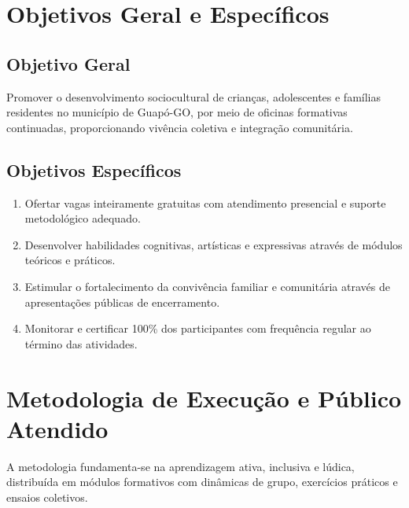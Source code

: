 \documentclass[12pt,a4paper]{article}
\begin{document}
\vspace{0.3cm}

\section{Objetivos Geral e Específicos}

\subsection{Objetivo Geral}
Promover o desenvolvimento sociocultural de crianças, adolescentes e famílias residentes no município de Guapó-GO, por meio de oficinas formativas continuadas, proporcionando vivência coletiva e integração comunitária.

\subsection{Objetivos Específicos}
\begin{enumerate}
    \item Ofertar vagas inteiramente gratuitas com atendimento presencial e suporte metodológico adequado.
    \item Desenvolver habilidades cognitivas, artísticas e expressivas através de módulos teóricos e práticos.
    \item Estimular o fortalecimento da convivência familiar e comunitária através de apresentações públicas de encerramento.
    \item Monitorar e certificar 100\% dos participantes com frequência regular ao término das atividades.
\end{enumerate}

\vspace{0.3cm}

\section{Metodologia de Execução e Público Atendido}

A metodologia fundamenta-se na aprendizagem ativa, inclusiva e lúdica, distribuída em módulos formativos com dinâmicas de grupo, exercícios práticos e ensaios coletivos.
\end{document}
